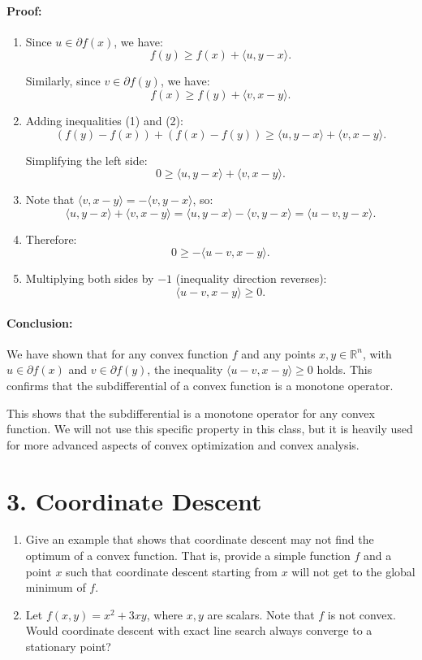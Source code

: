 \documentclass{article}
\begin{document}
\paragraph{Proof:}
\begin{enumerate}
    \item Since $u \in \partial f(x)$, we have:
    \[f(y) \geq f(x) + \langle u, y - x \rangle. \tag{1}\]
    
    Similarly, since $v \in \partial f(y)$, we have:
    \[f(x) \geq f(y) + \langle v, x - y \rangle. \tag{2}\]
    
    \item Adding inequalities (1) and (2):
    \[(f(y) - f(x)) + (f(x) - f(y)) \geq \langle u, y - x \rangle + \langle v, x - y \rangle.\]
    
    Simplifying the left side:
    \[0 \geq \langle u, y - x \rangle + \langle v, x - y \rangle. \tag{3}\]
    
    \item Note that $\langle v, x - y \rangle = -\langle v, y - x \rangle$, so:
    \[\langle u, y - x \rangle + \langle v, x - y \rangle = \langle u, y - x \rangle - \langle v, y - x \rangle = \langle u - v, y - x \rangle.\]
    
    \item Therefore:
    \[0 \geq -\langle u - v, x - y \rangle.\]
    
    \item Multiplying both sides by $-1$ (inequality direction reverses):
    \[\langle u - v, x - y \rangle \geq 0.\]
\end{enumerate}

\paragraph{Conclusion:} We have shown that for any convex function $f$ and any points $x, y \in \mathbb{R}^n$, with $u \in \partial f(x)$ and $v \in \partial f(y)$, the inequality $\langle u - v, x - y \rangle \geq 0$ holds. This confirms that the subdifferential of a convex function is a monotone operator.

This shows that the subdifferential is a monotone operator for any convex function. We will not use this specific property in this class, but it is heavily used for more advanced aspects of convex optimization and convex analysis.

\section*{3. Coordinate Descent}
\begin{enumerate}[label=(\alph*)]
    \item Give an example that shows that coordinate descent may not find the optimum of a convex function. That is, provide a simple function $f$ and a point $x$ such that coordinate descent starting from $x$ will not get to the global minimum of $f$.
    \item Let $f(x,y) = x^2 + 3xy$, where $x,y$ are scalars. Note that $f$ is not convex. Would coordinate descent with exact line search always converge to a stationary point?
\end{enumerate}
\end{document}
